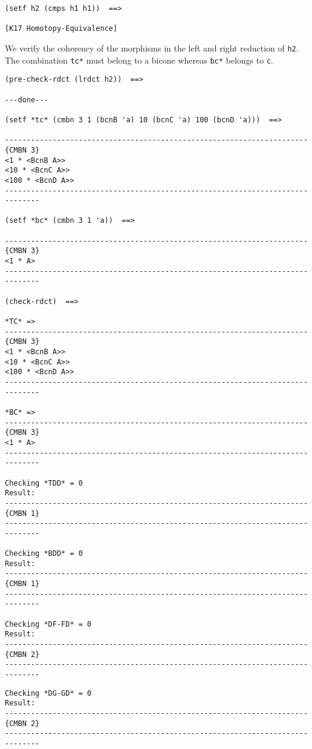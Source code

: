 {{\begin{verbatim}
(setf h2 (cmps h1 h1))  ==>

[K17 Homotopy-Equivalence]
\end{verbatim}}
We verify the coherency of the morphisms in the left and right reduction
of {\tt h2}. The combination {\tt *tc*} must belong to a bicone whereas
{\tt *bc*} belongs to {\tt c}.
{\footnotesize \begin{verbatim}
(pre-check-rdct (lrdct h2))  ==>

---done---

(setf *tc* (cmbn 3 1 (bcnB 'a) 10 (bcnC 'a) 100 (bcnD 'a)))  ==>

----------------------------------------------------------------------{CMBN 3}
<1 * <BcnB A>>
<10 * <BcnC A>>
<100 * <BcnD A>>
------------------------------------------------------------------------------

(setf *bc* (cmbn 3 1 'a))  ==>

----------------------------------------------------------------------{CMBN 3}
<1 * A>
------------------------------------------------------------------------------

(check-rdct)  ==>

*TC* =>
----------------------------------------------------------------------{CMBN 3}
<1 * <BcnB A>>
<10 * <BcnC A>>
<100 * <BcnD A>>
------------------------------------------------------------------------------

*BC* =>
----------------------------------------------------------------------{CMBN 3}
<1 * A>
------------------------------------------------------------------------------

Checking *TDD* = 0
Result:
----------------------------------------------------------------------{CMBN 1}
------------------------------------------------------------------------------

Checking *BDD* = 0
Result:
----------------------------------------------------------------------{CMBN 1}
------------------------------------------------------------------------------

Checking *DF-FD* = 0
Result:
----------------------------------------------------------------------{CMBN 2}
------------------------------------------------------------------------------
\end{verbatim}}
\newpage
{\footnotesize \begin{verbatim}
Checking *DG-GD* = 0
Result:
----------------------------------------------------------------------{CMBN 2}
------------------------------------------------------------------------------


\end{verbatim}}}
